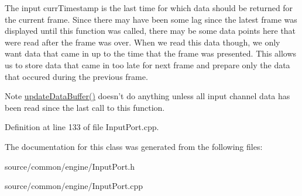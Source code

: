 The input curr\-Timestamp is the last time for which data should be returned for the current frame. Since there may have been some lag since the latest frame was displayed until this function was called, there may be some data points here that were read after the frame was over. When we read this data though, we only want data that came in up to the time that the frame was presented. This allows us to store data that came in too late for next frame and prepare only the data that occured during the previous frame. \begin{DoxyNote}{Note}
\hyperlink{class_picto_1_1_input_port_a885502b8712d339b918ac0c6ba418957}{update\-Data\-Buffer()} doesn't do anything unless all input channel data has been read since the last call to this function. 
\end{DoxyNote}


Definition at line 133 of file Input\-Port.\-cpp.



The documentation for this class was generated from the following files\-:\begin{DoxyCompactItemize}
\item 
source/common/engine/Input\-Port.\-h\item 
source/common/engine/Input\-Port.\-cpp\end{DoxyCompactItemize}
